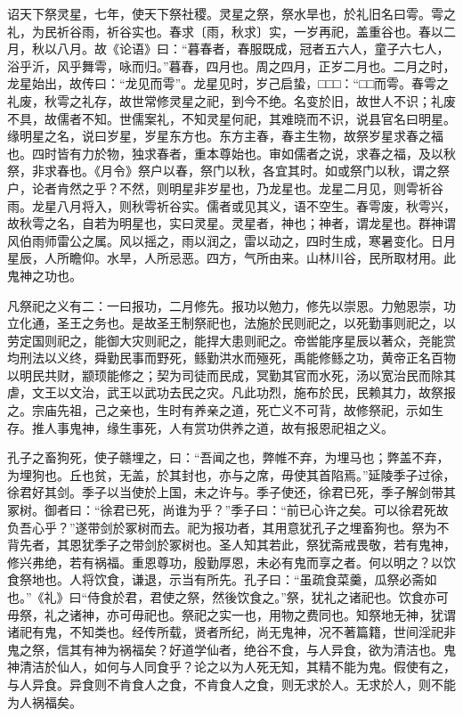 \documentclass[]{article}
\begin{document}
诏天下祭灵星，七年，使天下祭社稷。灵星之祭，祭水旱也，於礼旧名曰雩。雩之礼，为民祈谷雨，祈谷实也。春求〔雨，秋求〕实，一岁再祀，盖重谷也。春以二月，秋以八月。故《论语》曰：``暮春者，春服既成，冠者五六人，童子六七人，浴乎沂，风乎舞雩，咏而归。''暮春，四月也。周之四月，正岁二月也。二月之时，龙星始出，故传曰：``龙见而雩''。龙星见时，岁己启蛰，□□□：``□□而雩。春雩之礼废，秋雩之礼存，故世常修灵星之祀，到今不绝。名变於旧，故世人不识；礼废不具，故儒者不知。世儒案礼，不知灵星何祀，其难晓而不识，说县官名曰明星。缘明星之名，说曰岁星，岁星东方也。东方主春，春主生物，故祭岁星求春之福也。四时皆有力於物，独求春者，重本尊始也。审如儒者之说，求春之福，及以秋祭，非求春也。《月令》祭户以春，祭门以秋，各宜其时。如或祭门以秋，谓之祭户，论者肯然之乎？不然，则明星非岁星也，乃龙星也。龙星二月见，则雩祈谷雨。龙星八月将入，则秋雩祈谷实。儒者或见其义，语不空生。春雩废，秋雩兴，故秋雩之名，自若为明星也，实曰灵星。灵星者，神也；神者，谓龙星也。群神谓风伯雨师雷公之属。风以摇之，雨以润之，雷以动之，四时生成，寒暑变化。日月星辰，人所瞻仰。水旱，人所忌恶。四方，气所由来。山林川谷，民所取材用。此鬼神之功也。

凡祭祀之义有二：一曰报功，二月修先。报功以勉力，修先以崇恩。力勉恩崇，功立化通，圣王之务也。是故圣王制祭祀也，法施於民则祀之，以死勤事则祀之，以劳定国则祀之，能御大灾则祀之，能捍大患则祀之。帝喾能序星辰以著众，尧能赏均刑法以义终，舜勤民事而野死，鲧勤洪水而殛死，禹能修鲧之功，黄帝正名百物以明民共财，颛顼能修之；契为司徒而民成，冥勤其官而水死，汤以宽治民而除其虐，文王以文治，武王以武功去民之灾。凡此功烈，施布於民，民赖其力，故祭报之。宗庙先祖，己之亲也，生时有养亲之道，死亡义不可背，故修祭祀，示如生存。推人事鬼神，缘生事死，人有赏功供养之道，故有报恩祀祖之义。

孔子之畜狗死，使子赣埋之，曰：``吾闻之也，弊帷不弃，为埋马也；弊盖不弃，为埋狗也。丘也贫，无盖，於其封也，亦与之席，毋使其首陷焉。''延陵季子过徐，徐君好其剑。季子以当使於上国，未之许与。季子使还，徐君已死，季子解剑带其冢树。御者曰：``徐君已死，尚谁为乎？''季子曰：``前已心许之矣。可以徐君死故负吾心乎？''遂带剑於冢树而去。祀为报功者，其用意犹孔子之埋畜狗也。祭为不背先者，其恩犹季子之带剑於冢树也。圣人知其若此，祭犹斋戒畏敬，若有鬼神，修兴弗绝，若有祸福。重恩尊功，殷勤厚恩，未必有鬼而享之者。何以明之？以饮食祭地也。人将饮食，谦退，示当有所先。孔子曰：``虽疏食菜羹，瓜祭必斋如也。''《礼》曰``侍食於君，君使之祭，然後饮食之。''祭，犹礼之诸祀也。饮食亦可毋祭，礼之诸神，亦可毋祀也。祭祀之实一也，用物之费同也。知祭地无神，犹谓诸祀有鬼，不知类也。经传所载，贤者所纪，尚无鬼神，况不著篇籍，世间淫祀非鬼之祭，信其有神为祸福矣？好道学仙者，绝谷不食，与人异食，欲为清洁也。鬼神清洁於仙人，如何与人同食乎？论之以为人死无知，其精不能为鬼。假使有之，与人异食。异食则不肯食人之食，不肯食人之食，则无求於人。无求於人，则不能为人祸福矣。
\end{document}
